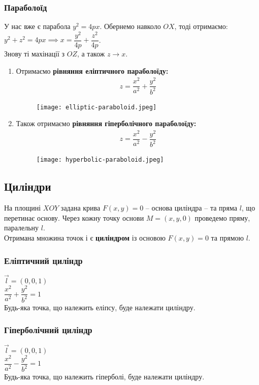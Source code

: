 \documentclass[a4paper, 10pt]{extarticle}
\theoremstyle{theoremdd}
\theoremstyle{theoremdd}
\theoremstyle{theoremdd}
\theoremstyle{theoremdd}
\theoremstyle{theoremdd}
\theoremstyle{theoremdd}
\theoremstyle{theoremdd}
\theoremstyle{theoremdd}
\begin{document}
\subsubsection{Параболоїд}
У нас вже є парабола $y^2 = 4px$. Обернемо навколо $OX$, тоді отримаємо:\\
$y^2+z^2 = 4px \implies x = \dfrac{y^2}{4p} + \dfrac{z^2}{4p}$.\\
Знову ті махінації з $OZ$, а також $z \to x$.\\
\begin{enumerate}[wide=0pt,label={\Roman*.}]
\item Отримаємо \textbf{рівняння еліптичного параболоїду:}
\begin{align*}
z = \dfrac{x^2}{a^2} + \dfrac{y^2}{b^2}
\end{align*}
\begin{figure}[H]
\centering
\texttt{[image: elliptic-paraboloid.jpeg]}
\end{figure}
\item Також отримаємо \textbf{рівняння гіперболічного параболоїду:}
\begin{align*}
z = \dfrac{x^2}{a^2} - \dfrac{y^2}{b^2}
\end{align*}

\begin{figure}[H]
\centering
\texttt{[image: hyperbolic-paraboloid.jpeg]}
\end{figure}
\end{enumerate}

\subsection{Циліндри}
На площині $XOY$ задана крива $F(x,y) = 0$ -- основа циліндра -- та пряма $l$, що перетинає основу. Через кожну точку основи $M = (x,y,0)$ проведемо пряму, паралельну $l$.\\
Отримана множина точок і є \textbf{циліндром} із основою $F(x,y) = 0$ та прямою $l$.\\

\subsubsection{Еліптичний циліндр}
$\vec{l} = (0,0,1)$\\
$\dfrac{x^2}{a^2} + \dfrac{y^2}{b^2} = 1$\\
Будь-яка точка, що належить еліпсу, буде належати циліндру.

\subsubsection{Гіперболічний циліндр}
$\vec{l} = (0,0,1)$\\
$\dfrac{x^2}{a^2} - \dfrac{y^2}{b^2} = 1$\\
Будь-яка точка, що належить гіперболі, буде належати циліндру.
\end{document}
